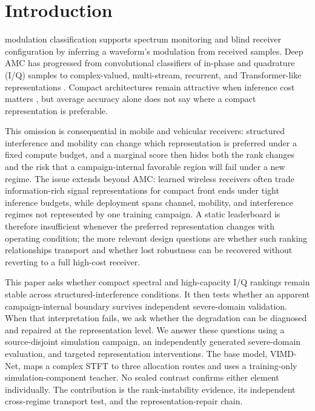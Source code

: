 \documentclass[letterpaper,journal]{IEEEtran}
\newcommand{\method}{VIMD-Net}
\begin{document}
\section{Introduction}
 modulation classification supports spectrum
monitoring and blind receiver configuration by inferring a waveform's
modulation from received samples. Deep AMC has progressed from convolutional
classifiers of in-phase and quadrature (I/Q) samples
\cite{oshea2016cnn,meng2018amc} to complex-valued,
multi-stream, recurrent, and Transformer-like representations
\cite{tu2020complex,zhang2020dual,xu2020mcldnn,cai2022transformer,
shao2025iqformer}. Compact architectures remain attractive when inference cost
matters \cite{wang2020lightamc,efficientamc2026tgcn}, but average accuracy
alone does not say where a compact representation is preferable.

This omission is consequential in mobile and vehicular receivers: structured
interference and mobility can change which representation is preferred under
a fixed compute budget, and a marginal score then hides both the rank changes
and the risk that a campaign-internal favorable region will fail under a new
regime. The issue extends beyond AMC: learned wireless receivers often trade
information-rich signal representations for compact front ends under tight
inference budgets, while deployment spans channel, mobility, and interference
regimes not represented by one training campaign. A static leaderboard is
therefore insufficient whenever the preferred representation changes with
operating condition; the more relevant design questions are whether such
ranking relationships transport and whether lost robustness can be recovered
without reverting to a full high-cost receiver.

This paper asks whether compact spectral and high-capacity I/Q rankings remain
stable across structured-interference conditions. It then tests whether an
apparent campaign-internal boundary survives independent severe-domain
validation. When that interpretation fails, we ask whether the degradation can
be diagnosed and repaired at the representation level. We answer these
questions using a source-disjoint simulation campaign, an independently
generated severe-domain evaluation, and targeted representation interventions.
The base model, \method, maps a complex STFT to
three allocation routes and uses a training-only simulation-component teacher.
No sealed contrast confirms either element individually. The contribution is
the rank-instability evidence, its independent cross-regime transport test,
and the representation-repair chain.
\end{document}
